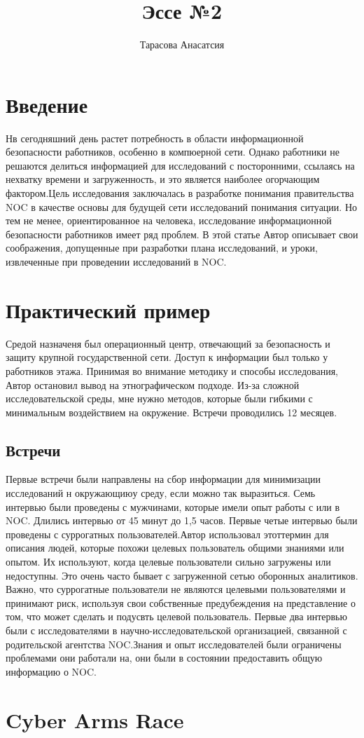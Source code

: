 \documentclass[12pt,]{article}
\author{Тарасова Анасатсия}
\title{Эссе №2}
\begin{document}
\maketitle
\section{Введение}
Нв сегодняшний день растет потребность в  области информационной безопасности работников, особенно в компюерной сети. Однако работники не решаются делиться информацией для исследований с посторонними, ссылаясь на нехватку времени и загруженность, и это является наиболее огорчающим фактором.Цель исследования заключалась в разработке понимания правительства NOC в качестве основы для будущей сети исследований понимания ситуации. Но тем не менее, ориентированное на человека, исследование информационной безопасности работников имеет ряд проблем. В этой статье Автор описывает свои соображения, допущенные при разработки плана исследований, и уроки, извлеченные при проведении исследований в NOC.
\section{Практический пример}
Средой назначеня был операционный центр, отвечающий за безопасность и защиту крупной государственной сети. Доступ к информации был только у работников этажа. Принимая во внимание методику и способы исследования, Автор остановил вывод на этнографическом подходе. Из-за сложной исследовательской среды, мне нужно методов, которые были гибкими с минимальным воздействием на окружение. Встречи проводились 12 месяцев. 
\subsection{Встречи}
Первые встречи были направлены на сбор информации для минимизации исследований н окружающиюу среду, если можно так выразиться. Семь интервью были проведены с мужчинами, которые имели опыт работы с или в NOC. Длились интервью от 45 минут до 1,5 часов. Первые четые интервью были проведены с суррогатных пользователей.Автор использовал этоттермин для описания людей, которые похожи целевых пользователь общими знаниями или опытом. Их используют, когда целевые пользователи сильно загружены или недоступны. Это очень часто бывает с загруженной сетью оборонных аналитиков. Важно, что суррогатные пользователи не являются целевыми пользователями и принимают риск, используя свои собственные предубеждения на представление о том, что может сделать и подусвть целевой пользователь. Первые два интервью были с исследователями в научно-исследовательской организацией, связанной с родительской агентства NOC.Знания и опыт исследователей были ограничены проблемами они работали на, они были в состоянии предоставить общую информацию о NOC.

\section{Cyber Arms Race}
\end{document}

